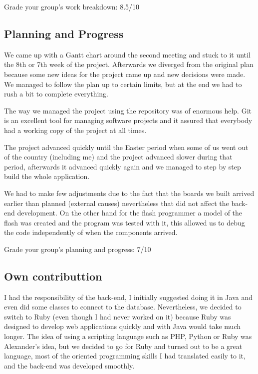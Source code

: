 Grade your group’s work breakdown: 8.5/10

\subsection{Planning and Progress}

We came up with a Gantt chart around the second meeting and stuck to it until the 8th or 7th week of the project. Afterwards we diverged from the original plan
because some new ideas for the project came up and new decisions were made.  We managed to follow the plan up to certain limits, but at the end we had to rush a
bit to complete everything.

The way we managed the project using the repository was of enormous help. Git is an excellent tool for managing software projects and it assured that everybody
had a working copy of the project at all times.

The project advanced quickly until the Easter period when some of us went out of the country (including me) and the project advanced slower during that period,
afterwards it advanced quickly again and we managed to step by step build the whole application.

We had to make few adjustments due to the fact that the boards we built arrived earlier than planned (external causes) nevertheless that did not affect the
back-end development. On the other hand for the flash programmer a model of the flash was created and the program was tested with it, this allowed us to debug
the code independently of when the components arrived.

Grade your group’s planning and progress:	7/10

\subsection{Own contributtion}

I had the responsibility of the back-end, I initially suggested doing it in Java and even did some classes to connect to the database. Nevertheless, we decided
to switch to Ruby (even though I had never worked on it) because Ruby was designed to develop web applications quickly and with Java would take much longer. The
idea of using a scripting language such as PHP, Python or Ruby was Alexander's idea, but we decided to go for Ruby and turned out to be a great language, most of
the oriented programming skills I had translated easily to it, and the back-end was developed smoothly.

